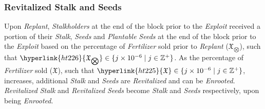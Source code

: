 \documentclass[tikz]{article}
\newcommand{\term}[1]{\textsl{#1}}
\begin{document}
\subsubsection{Revitalized Stalk and Seeds}
Upon \term{Replant}, \term{Stalkholders} at the end of the block prior to the \term{Exploit} received a portion of their \term{Stalk}, \term{Seeds} and \term{Plantable} \term{Seeds} at the end of the block prior to the \term{Exploit} based on the percentage of \term{Fertilizer} sold prior to \term{Replant} (\hyperlink{ht226}{$\mathfrak{X}_{\bigotimes}$}), such that $\hyperlink{ht226}{\mathfrak{X}_{\bigotimes}} \in \{j \times 10^{-6} \mid j \in \mathbb{Z}^{+} \}$. As the percentage of \term{Fertilizer} sold (\hyperlink{ht225}{$\mathfrak{X}$}), such that $\hyperlink{ht225}{\mathfrak{X}} \in \{j \times 10^{-6} \mid j \in \mathbb{Z}^{+} \}$, increases, additional \term{Stalk} and \term{Seeds} are \term{Revitalized} and can be \term{Enrooted}. \term{Revitalized} \term{Stalk} and \term{Revitalized} \term{Seeds} become \term{Stalk} and \term{Seeds} respectively, upon being \term{Enrooted}. 
\end{document}
